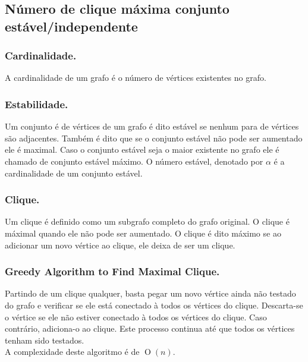 \documentclass[12pt]{article}
\newcommand{\BigO}[1]{\ensuremath{\operatorname{O}\left(#1\right)}}
\begin{document}


\subsection{Número de clique máxima conjunto estável/independente}

\subsubsection{Cardinalidade.}

A cardinalidade de um grafo é o número de vértices existentes no grafo.

\subsubsection{Estabilidade.}

Um conjunto é de vértices de um grafo é dito estável se nenhum para de vértices são adjacentes. Também é dito que se o conjunto estável não pode ser aumentado ele é maximal. Caso o conjunto estável seja o maior existente no grafo ele é chamado de conjunto estável máximo. O número estável, denotado por $\alpha$ é a cardinalidade de um conjunto estável.

\subsubsection{Clique.}
Um clique é definido como um subgrafo completo do grafo original. O clique é máximal quando ele não pode ser aumentado. O clique é dito máximo se ao adicionar um novo vértice ao clique, ele deixa de ser um clique.

\subsubsection{Greedy Algorithm to Find Maximal Clique.}

Partindo de um clique qualquer, basta pegar um novo vértice ainda não testado do grafo e verificar se ele está conectado à todos os vértices do clique. Descarta-se o vértice se ele não estiver conectado à todos os vértices do clique. Caso contrário, adiciona-o ao clique. Este processo continua até que todos os vértices tenham sido testados.\\

A complexidade deste algoritmo é de \BigO{n}.
\end{document}
